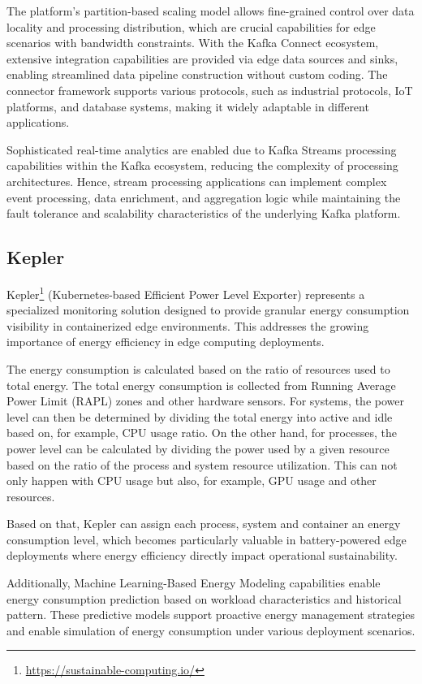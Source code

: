 The platform's partition-based scaling model allows fine-grained control over data locality and processing distribution, which are crucial capabilities for edge scenarios with bandwidth constraints. With the Kafka Connect ecosystem, extensive integration capabilities are provided via edge data sources and sinks, enabling streamlined data pipeline construction without custom coding.
The connector framework supports various protocols, such as industrial protocols, IoT platforms, and database systems, making it widely adaptable in different applications.

Sophisticated real-time analytics are enabled due to Kafka Streams processing capabilities within the Kafka ecosystem, reducing the complexity of processing architectures.
Hence, stream processing applications can implement complex event processing, data enrichment, and aggregation logic while maintaining the fault tolerance and scalability characteristics of the underlying Kafka platform.
\subsection{Kepler}
Kepler\footnote{\url{https://sustainable-computing.io/}} (Kubernetes-based Efficient Power Level Exporter) represents a specialized monitoring solution designed to provide granular energy consumption visibility in containerized edge environments.
This addresses the growing importance of energy efficiency in edge computing deployments.

The energy consumption is calculated based on the ratio of resources used to total energy.
The total energy consumption is collected from Running Average Power Limit (RAPL) zones and other hardware sensors.
For systems, the power level can then be determined by dividing the total energy into active and idle based on, for example, CPU usage ratio.
On the other hand, for processes, the power level can be calculated by dividing the power used by a given resource based on the ratio of the process and system resource utilization.
This can not only happen with CPU usage but also, for example, GPU usage and other resources.

Based on that, Kepler can assign each process, system and container an energy consumption level, which becomes particularly valuable in battery-powered edge deployments where energy efficiency directly impact operational sustainability.

Additionally, Machine Learning-Based Energy Modeling capabilities enable energy consumption prediction based on workload characteristics and historical pattern. These predictive models support proactive energy management strategies and enable simulation of energy consumption under various deployment scenarios.

